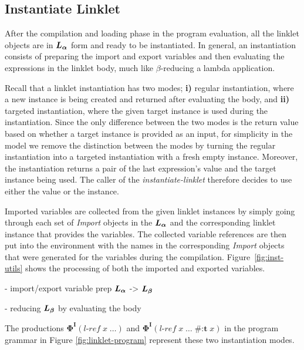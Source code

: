 \documentclass[sigplan,screen,anonymous]{acmart}
\def\dash {\text{-}}
\begin{document}

\subsection{Instantiate Linklet}
\label{sec:instantiate}

After the compilation and loading phase in the program evaluation, all
the linklet objects are in $\bm{L_\alpha}$ form and ready to be instantiated. In
general, an instantiation consists of preparing the import and export
variables and then evaluating the expressions in the linklet body,
much like $\beta$-reducing a lambda application.

Recall that a linklet instantiation has two modes; \textbf{i)} regular
instantiation, where a new instance is being created and returned
after evaluating the body, and \textbf{ii)} targeted instantiation,
where the given target instance is used during the
instantiation. Since the only difference between the two modes is the
return value based on whether a target instance is provided as an
input, for simplicity in the model we remove the distinction between
the modes by turning the regular instantiation into a targeted
instantiation with a fresh empty instance. Moreover, the instantiation
returns a pair of the last expression's value and the target instance
being used. The caller of the \emph{instantiate-linklet} therefore
decides to use either the value or the instance.

Imported variables are collected from the given linklet instances by
simply going through each set of \emph{Import} objects in the $\bm{L_\alpha}$
and the corresponding linklet instance that provides the
variables. The collected variable references are then put into the
environment with the names in the corresponding \emph{Import} objects
that were generated for the variables during the
compilation. Figure~\ref{fig:inst-utils} shows the processing of both
the imported and exported variables.

- import/export variable prep $\bm{L_\alpha}$
-> $\bm{L_\beta}$

- reducing $\bm{L_\beta}$ by evaluating the body

 The productions $\bm{\Phi^I}(l\dash ref\; x\; \ldots)$ and
$\bm{\Phi^I}(l\dash ref\; x\; \ldots\; \textbf{\#:t}\; x)$ in the program
grammar in Figure \ref{fig:linklet-program} represent these two
instantiation modes.



\newcommand{\redinput}[1]{EP\;\llbracket #1 \rrbracket, \rho, \sigma\;}
\newcommand{\redoutput}[3]{EP\;\llbracket #1 \rrbracket, #2, #3\;}
\end{document}
